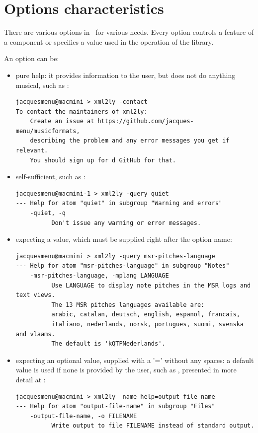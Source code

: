 \section{Options characteristics}\label{Options characteristics}

There are various options in \mf\ for various needs. Every option controls a feature of a component or specifies a value used in the operation of the library.

An option can be:
\begin{itemize}
\item pure help:
it provides information to the user, but does not do anything musical, such as :
\begin{lstlisting}[language=Terminal]
jacquesmenu@macmini > xml2ly -contact
To contact the maintainers of xml2ly:
    Create an issue at https://github.com/jacques-menu/musicformats,
    describing the problem and any error messages you get if relevant.
    You should sign up for d GitHub for that.
\end{lstlisting}

\item self-sufficient, such as :
\begin{lstlisting}[language=Terminal]
jacquesmenu@macmini-1 > xml2ly -query quiet
--- Help for atom "quiet" in subgroup "Warning and errors"
    -quiet, -q
          Don't issue any warning or error messages.
\end{lstlisting}

\item expecting a value, which must be supplied right after the option name:
\begin{lstlisting}[language=Terminal]
jacquesmenu@macmini > xml2ly -query msr-pitches-language
--- Help for atom "msr-pitches-language" in subgroup "Notes"
    -msr-pitches-language, -mplang LANGUAGE
          Use LANGUAGE to display note pitches in the MSR logs and text views.
          The 13 MSR pitches languages available are:
          arabic, catalan, deutsch, english, espanol, francais,
          italiano, nederlands, norsk, portugues, suomi, svenska and vlaams.
          The default is 'kQTPNederlands'.
\end{lstlisting}

\item expecting an optional value, supplied with a '=' without any spaces:
a default value is used if none is provided by the user, such as , presented in more detail at :
\begin{lstlisting}[language=Terminal]
jacquesmenu@macmini > xml2ly -name-help=output-file-name
--- Help for atom "output-file-name" in subgroup "Files"
    -output-file-name, -o FILENAME
          Write output to file FILENAME instead of standard output.
\end{lstlisting}

\end{itemize}


